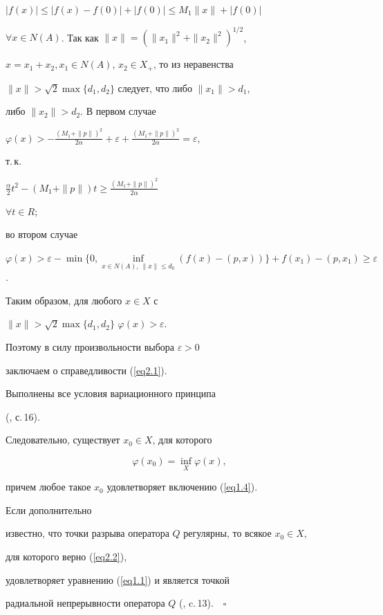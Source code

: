 $|f(x)| \le |f(x)-f(0)|+|f(0)| \le M_1\|x\|+|f(0)|$


$\forall x\in N(A)$. Так как $\| x\| =(\| x_1\| ^2 +\| x_2 \| ^2)^{1/2}$,


$x=x_1+x_2, x_1\in N(A)$, $x_2\in X_{+}$, то из неравенства


$\| x\| >\sqrt{2}\max\{d_1,d_2\}$ следует, что либо $\|x_1\|>d_1$,


либо $\|x_2\|>d_2$. В первом случае


$\varphi (x)>-\frac{(M_1+\|p\|)^2}{2\alpha}+\varepsilon+\frac{(M_1+\|p\|)^2}


{2\alpha}=\varepsilon$,


т.\,к.


$\frac{\alpha}{2}t^2-(M_1+\|p\|) t\ge\frac{(M_1+\|p\|)^2}{2\alpha}$


$\forall t\in R$;


во втором случае


$\varphi (x)>\varepsilon -\min\big\{0,\inf\limits_{x\in N(A),\ \|x\|\le d_0}


(f(x)-(p,x)) \big\}+f(x_1)-(p,x_1)\ge\varepsilon$.


Таким образом, для любого $x\in X$ с


$\|x\|>\sqrt{2}\max\{d_1,d_2\}$\; $\varphi (x)>\varepsilon$.


Поэтому в силу произвольности выбора $\varepsilon > 0$


заключаем о справедливости (\ref{eq2.1}).


Выполнены все условия вариационного принципа


(\cite{n20}, с.\,16).


Следовательно, существует $x_0\in X$, для которого


\begin{equation}


\varphi (x_0)=\inf\limits_X\varphi (x),\label{eq2.2}


\end{equation}


причем любое такое $x_0$ удовлетворяет включению (\ref{eq1.4}).


Если дополнительно


известно, что точки разрыва оператора $Q$ регулярны, то всякое $x_0\in X$,


для которого верно (\ref{eq2.2}),


удовлетворяет уравнению (\ref{eq1.1}) и является точкой


радиальной непрерывности оператора $Q$ (\cite{n20}, c.\,13)$.\quad\square$


